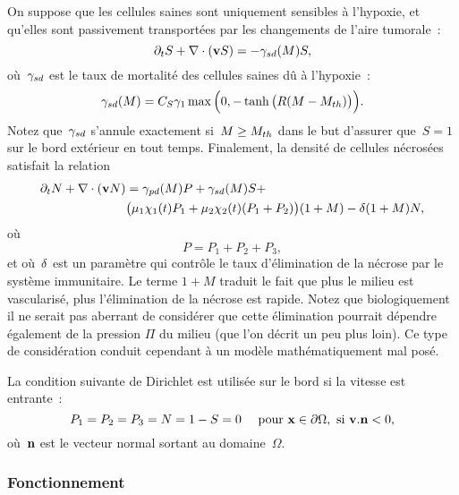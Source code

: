 \documentclass[main.tex]{subfiles}
\begin{document}
On suppose que les cellules saines sont uniquement sensibles à l'hypoxie, et qu'elles sont passivement transportées par les changements de l'aire tumorale~:
\begin{equation}
\partial_t S + \nabla\cdot(\mathbf{v} S) =  -\gamma_{sd}(M) S, \label{eq_S}
\end{equation}
où~$\gamma_{sd}$ est le taux de mortalité des cellules saines dû à l'hypoxie~:
\begin{equation}
\gamma_{sd}(M)=C_S \gamma_1  \max\Big(0,-\tanh\big(R(M-M_{th})\big)\Big). \label{eq_gammasd}
\end{equation}
Notez que~$\gamma_{sd}$  s'annule exactement si~$M\geq M_{th}$ dans le but d'assurer que~$S=1$ sur le bord extérieur en tout temps. Finalement, la densité de cellules nécrosées satisfait la relation 
\begin{equation}\label{eq_N}
\begin{aligned}
\partial_t N + \nabla\cdot(\mathbf{v} N) & =  \gamma_{pd}(M) P +\gamma_{sd}(M) S  + \\ & \big(\mu_1 \chi_1(t)P_1 + \mu_2\chi_2(t)(P_1+P_2)\big)(1+M) - \delta(1+M)N,
\end{aligned}\end{equation}
où
\begin{equation}
P = P_1+P_2+P_3,
\end{equation}
et où~$\delta$ est un paramètre qui contrôle le taux d'élimination de la nécrose par le système immunitaire. Le terme $1+M$ traduit le fait que plus le milieu est vascularisé, plus l'élimination de la nécrose est rapide. 
Notez que biologiquement il ne serait pas aberrant de considérer que cette élimination pourrait dépendre également de la pression $\Pi$ du milieu (que l'on décrit un peu plus loin). Ce type de considération conduit cependant à un modèle mathématiquement mal posé. 


La condition suivante de Dirichlet est utilisée sur le bord si la vitesse est entrante~:
\begin{equation}\label{eq_CL_pop}
P_1=P_2=P_3=N=1-S=0  \quad \textrm{ pour } \mathbf{x} \in \partial \Omega, \textrm{ si } \mathbf{v}.{\bf n}<0,
\end{equation}
où~${\bf n}$ est le vecteur normal sortant au domaine~$\Omega$.
\subsubsection{Fonctionnement}
\end{document}

